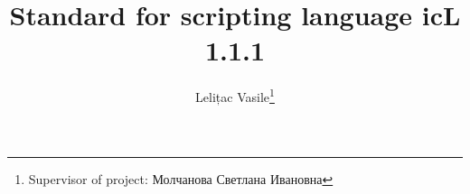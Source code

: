 \documentclass[a4paper, 12pt]{extarticle}
\begin{document}



\title{Standard for scripting language icL 1.1.1}
\author{Lelițac Vasile\thanks{Supervisor of project: Молчанова Светлана Ивановна}}

\clearpage\maketitle
\thispagestyle{empty}
\newpage

%

\makeatletter
\renewcommand{\l@section}{\@dottedtocline{1}{1.5em}{2.6em}}
\renewcommand{\l@subsection}{\@dottedtocline{2}{4.0em}{3.6em}}
\renewcommand{\l@subsubsection}{\@dottedtocline{3}{7.4em}{4.5em}}
\makeatother
\tableofcontents
\end{document}
